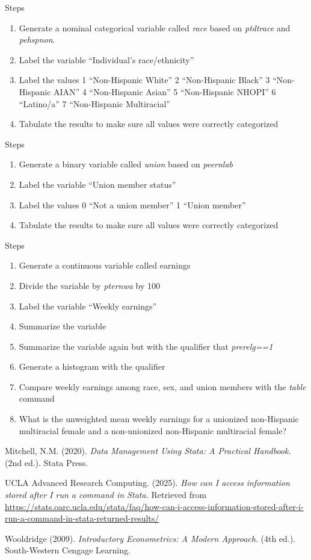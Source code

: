 \documentclass[
]{book}
\providecommand{\tightlist}{%
  \setlength{\itemsep}{0pt}\setlength{\parskip}{0pt}}
\begin{document}
Steps

\begin{enumerate}
\def\labelenumi{\arabic{enumi}.}
\tightlist
\item
  Generate a nominal categorical variable called \emph{race} based on \emph{ptdtrace} and \emph{pehspnon}.
\item
  Label the variable ``Individual's race/ethnicity''
\item
  Label the values 1 ``Non-Hispanic White'' 2 ``Non-Hispanic Black'' 3 ``Non-Hispanic AIAN'' 4 ``Non-Hispanic Asian'' 5 ``Non-Hispanic NHOPI'' 6 ``Latino/a'' 7 ``Non-Hispanic Multiracial''
\item
  Tabulate the results to make sure all values were correctly categorized
\end{enumerate}

Steps

\begin{enumerate}
\def\labelenumi{\arabic{enumi}.}
\tightlist
\item
  Generate a binary variable called \emph{union} based on \emph{peernlab}
\item
  Label the variable ``Union member status''
\item
  Label the values 0 ``Not a union member'' 1 ``Union member''
\item
  Tabulate the results to make sure all values were correctly categorized
\end{enumerate}

Steps

\begin{enumerate}
\def\labelenumi{\arabic{enumi}.}
\tightlist
\item
  Generate a continuous variable called earnings
\item
  Divide the variable by \emph{pternwa} by 100
\item
  Label the variable ``Weekly earnings''
\item
  Summarize the variable
\item
  Summarize the variable again but with the qualifier that \emph{prerelg==1}
\item
  Generate a histogram with the qualifier
\item
  Compare weekly earnings among race, sex, and union members with the \emph{table} command
\item
  What is the unweighted mean weekly earnings for a unionized non-Hispanic multiracial female and a non-unionized non-Hispanic multiracial female?
\end{enumerate}

Mitchell, N.M. (2020). \emph{Data Management Using Stata: A Practical Handbook}. (2nd ed.). Stata Press.

UCLA Advanced Research Computing. (2025). \emph{How can I access information stored after I run a command in Stata.} Retrieved from \url{https://stats.oarc.ucla.edu/stata/faq/how-can-i-access-information-stored-after-i-run-a-command-in-stata-returned-results/}

Wooldridge (2009). \emph{Introductory Econometrics: A Modern Approach}. (4th ed.). South-Western Cengage Learning.


\end{document}
